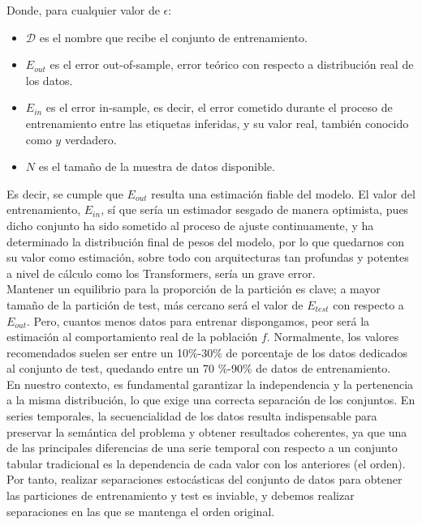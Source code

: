 Donde, para cualquier valor de $\epsilon$:
\begin{itemize}
	\item $\mathcal{D}$ es el nombre que recibe el conjunto de entrenamiento.
	\item $ E_{out}$ es el error out-of-sample, error teórico con respecto a distribución real de los datos.
	\item  $E_{in}$ es el error in-sample, es decir, el error cometido durante el proceso de entrenamiento entre las etiquetas inferidas, y su valor real, también conocido como $y$ verdadero.
	\item $N$ es el tamaño de la muestra de datos disponible.
\end{itemize}

Es decir, se cumple que $E_{out}$ resulta una estimación fiable del modelo. El valor del entrenamiento, $E_{in}$, sí que sería un estimador sesgado de manera optimista, pues dicho conjunto ha sido sometido al proceso de ajuste continuamente, y ha determinado la distribución final de pesos del modelo, por lo que quedarnos con su valor como estimación, sobre todo con arquitecturas tan profundas y potentes a nivel de cálculo como los Transformers, sería un grave error.\\

Mantener un equilibrio para la proporción de la partición es clave; a mayor tamaño de la partición de test, más cercano será el valor de $E_{test}$ con respecto a $E_{out}$. Pero, cuantos menos datos para entrenar dispongamos, peor será la estimación al comportamiento real de la población $f$. Normalmente, los valores recomendados suelen ser entre un 10\%-30\% de porcentaje de los datos dedicados al conjunto de test, quedando entre un 70 \%-90\% de datos de entrenamiento.\\

En nuestro contexto, es fundamental garantizar la independencia y la pertenencia a la misma distribución, lo que exige una correcta separación de los conjuntos. En series temporales, la secuencialidad de los datos resulta indispensable para preservar la semántica del problema y obtener resultados coherentes, ya que una de las principales diferencias de una serie temporal con respecto a un conjunto tabular tradicional es la dependencia de cada valor con los anteriores (el orden). Por tanto, realizar separaciones estocásticas del conjunto de datos para obtener las particiones de entrenamiento y test es inviable, y debemos realizar separaciones en las que se mantenga el orden original.\\

